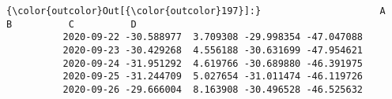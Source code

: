 \documentclass[11pt]{article}
\begin{document}
\begin{Verbatim}[commandchars=\\\{\}]
{\color{outcolor}Out[{\color{outcolor}197}]:}                     A         B          C          D
          2020-09-22 -30.588977  3.709308 -29.998354 -47.047088
          2020-09-23 -30.429268  4.556188 -30.631699 -47.954621
          2020-09-24 -31.951292  4.619766 -30.689880 -46.391975
          2020-09-25 -31.244709  5.027654 -31.011474 -46.119726
          2020-09-26 -29.666004  8.163908 -30.496528 -46.525632
\end{Verbatim}
            

    
    
    
    
\end{document}
